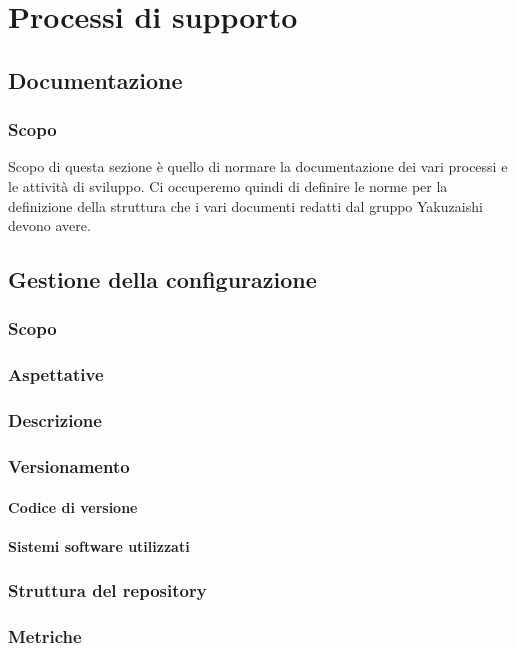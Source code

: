 \section{Processi di supporto}\label{section:processi_supporto}
\subsection{Documentazione}
\subsubsection{Scopo}\label{subsubsection: scopo}
Scopo di questa sezione è quello di normare la documentazione dei vari processi e le attività di sviluppo.
Ci occuperemo quindi di definire le norme per la definizione della struttura che i vari documenti redatti dal gruppo Yakuzaishi devono avere.
\subsection{Gestione della configurazione}\label{subsection:gestione_configurazione}
\subsubsection{Scopo}
\subsubsection{Aspettative}
\subsubsection{Descrizione}
\subsubsection{Versionamento}
\paragraph{Codice di versione}
\paragraph{Sistemi software utilizzati}
\subsubsection{Struttura del repository}
\subsubsection{Metriche}
